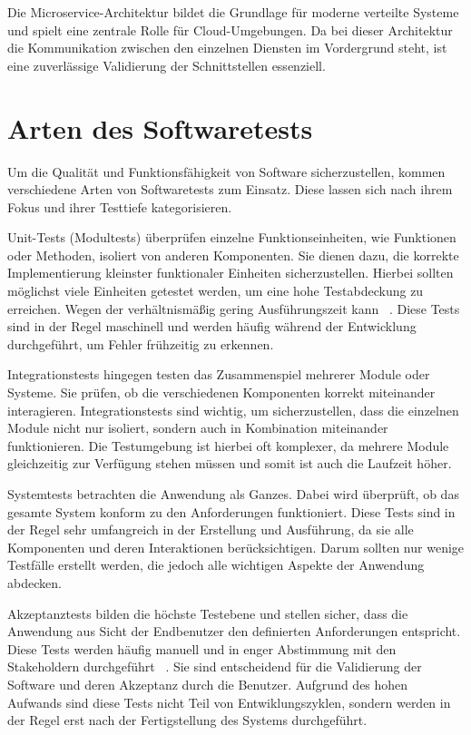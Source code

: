 Die Microservice-Architektur bildet die Grundlage für moderne verteilte Systeme und spielt eine zentrale Rolle für Cloud-Umgebungen.
Da bei dieser Architektur die Kommunikation zwischen den einzelnen Diensten im Vordergrund steht, ist eine zuverlässige Validierung der Schnittstellen essenziell.


\section{Arten des Softwaretests}\label{sec:foundation_testing}

Um die Qualität und Funktionsfähigkeit von Software sicherzustellen, kommen verschiedene Arten von Softwaretests zum Einsatz.
Diese lassen sich nach ihrem Fokus und ihrer Testtiefe kategorisieren.

Unit-Tests (Modultests) überprüfen einzelne Funktionseinheiten, wie Funktionen oder Methoden, isoliert von anderen Komponenten.
Sie dienen dazu, die korrekte Implementierung kleinster funktionaler Einheiten sicherzustellen.
Hierbei sollten möglichst viele Einheiten getestet werden, um eine hohe Testabdeckung zu erreichen.
Wegen der verhältnismäßig gering Ausführungszeit kann
~\cite{linzBasiswissenSoftwaretest2024}.
Diese Tests sind in der Regel maschinell und werden häufig während der Entwicklung durchgeführt, um Fehler
frühzeitig zu erkennen.

Integrationstests hingegen testen das Zusammenspiel mehrerer Module oder Systeme.
Sie prüfen, ob die verschiedenen Komponenten korrekt miteinander interagieren.
Integrationstests sind wichtig, um sicherzustellen, dass die einzelnen Module nicht nur isoliert, sondern auch in Kombination miteinander funktionieren.
Die Testumgebung ist hierbei oft komplexer, da mehrere Module gleichzeitig zur Verfügung stehen müssen und somit ist
auch die Laufzeit höher.

Systemtests betrachten die Anwendung als Ganzes.
Dabei wird überprüft, ob das gesamte System konform zu den Anforderungen funktioniert.
Diese Tests sind in der Regel sehr umfangreich in der Erstellung und Ausführung, da sie alle Komponenten und deren Interaktionen berücksichtigen.
Darum sollten nur wenige Testfälle erstellt werden, die jedoch alle wichtigen Aspekte der Anwendung abdecken.

Akzeptanztests bilden die höchste Testebene und stellen sicher, dass die Anwendung aus Sicht der Endbenutzer den definierten Anforderungen entspricht.
Diese Tests werden häufig manuell und in enger Abstimmung mit den Stakeholdern durchgeführt~
\cite{singhSoftwareTesting2011}.
Sie sind entscheidend für die Validierung der Software und deren Akzeptanz durch die Benutzer.
Aufgrund des hohen Aufwands sind diese Tests nicht Teil von Entwiklungszyklen, sondern werden in der Regel erst nach der Fertigstellung des Systems durchgeführt.

